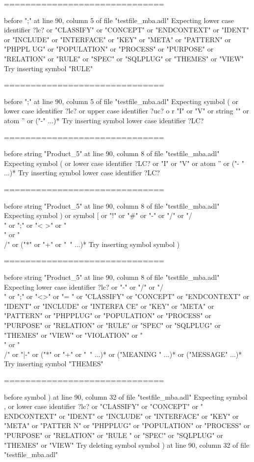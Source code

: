 \begin{description}
\begin{haskell}
==============================

before ";" at line 90, column 5 of file "testfile_mba.adl"
Expecting lower case identifier ?lc? or "CLASSIFY" or "CONCEPT" or "ENDCONTEXT"
or "IDENT" or "INCLUDE" or "INTERFACE" or "KEY" or "META" or "PATTERN" or "PHPPL
UG" or "POPULATION" or "PROCESS" or "PURPOSE" or "RELATION" or "RULE" or "SPEC"
or "SQLPLUG" or "THEMES" or "VIEW"
Try inserting symbol "RULE"

==============================

before ";" at line 90, column 5 of file "testfile_mba.adl"
Expecting symbol ( or lower case identifier ?lc? or upper case identifier ?uc? o
r "I" or "V" or string "" or atom '' or ("-" ...)*
Try inserting symbol lower case identifier ?LC?

==============================

before string "Product_5" at line 90, column 8 of file "testfile_mba.adl"
Expecting symbol ( or lower case identifier ?LC? or "I" or "V" or atom '' or ("-
" ...)*
Try inserting symbol lower case identifier ?LC?

==============================

before string "Product_5" at line 90, column 8 of file "testfile_mba.adl"
Expecting symbol ) or symbol [ or "!" or "#" or "-" or "/" or "/\\" or ";" or "<
>" or "\\" or "\\/" or ("*" or "+" or "~" ...)*
Try inserting symbol symbol )

==============================

before string "Product_5" at line 90, column 8 of file "testfile_mba.adl"
Expecting lower case identifier ?lc? or "-" or "/" or "/\\" or ";" or "<>" or "=
" or "CLASSIFY" or "CONCEPT" or "ENDCONTEXT" or "IDENT" or "INCLUDE" or "INTERFA
CE" or "KEY" or "META" or "PATTERN" or "PHPPLUG" or "POPULATION" or "PROCESS" or
 "PURPOSE" or "RELATION" or "RULE" or "SPEC" or "SQLPLUG" or "THEMES" or "VIEW"
or "VIOLATION" or "\\" or "\\/" or "|-" or ("*" or "+" or "~" ...)* or ("MEANING
" ...)* or ("MESSAGE" ...)*
Try inserting symbol "THEMES"

==============================

before symbol ) at line 90, column 32 of file "testfile_mba.adl"
Expecting symbol , or lower case identifier ?lc? or "CLASSIFY" or "CONCEPT" or "
ENDCONTEXT" or "IDENT" or "INCLUDE" or "INTERFACE" or "KEY" or "META" or "PATTER
N" or "PHPPLUG" or "POPULATION" or "PROCESS" or "PURPOSE" or "RELATION" or "RULE
" or "SPEC" or "SQLPLUG" or "THEMES" or "VIEW"
Try deleting symbol symbol ) at line 90, column 32 of file "testfile_mba.adl"


\end{haskell}
\end{description}

